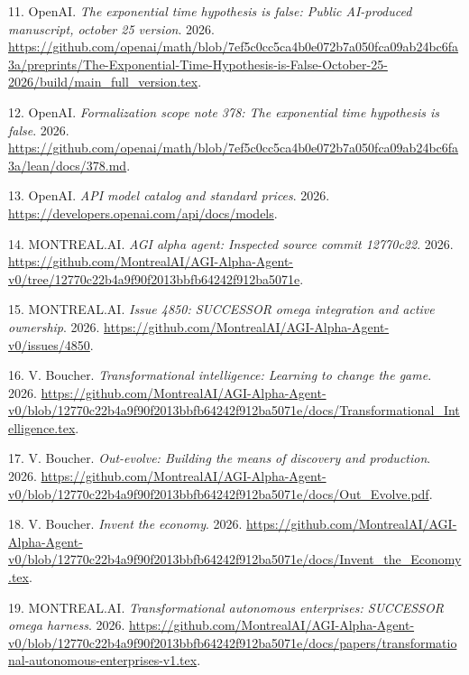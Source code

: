 \documentclass[
  11pt,
]{article}
\newlength{\cslhangindent}
\newlength{\cslentryspacingunit} %
\newenvironment{CSLReferences}[2] %
 {%
  \setlength{\parindent}{0pt}
  \ifodd #1
  \let\oldpar\par
  \def\par{\hangindent=\cslhangindent\oldpar}
  \fi
  \setlength{\parskip}{#2\cslentryspacingunit}
 }%
 {}
\begin{document}
\begin{CSLReferences}{1}{1}
\leavevmode{}%
11. OpenAI. \emph{The exponential time hypothesis is false: Public
AI-produced manuscript, october 25 version}. 2026.
\url{https://github.com/openai/math/blob/7ef5c0cc5ca4b0e072b7a050fca09ab24bc6fa3a/preprints/The-Exponential-Time-Hypothesis-is-False-October-25-2026/build/main_full_version.tex}.

\leavevmode{}%
12. OpenAI. \emph{Formalization scope note 378: The exponential time
hypothesis is false}. 2026.
\url{https://github.com/openai/math/blob/7ef5c0cc5ca4b0e072b7a050fca09ab24bc6fa3a/lean/docs/378.md}.

\leavevmode{}%
13. OpenAI. \emph{API model catalog and standard prices}. 2026.
\url{https://developers.openai.com/api/docs/models}.

\leavevmode{}%
14. MONTREAL.AI. \emph{AGI alpha agent: Inspected source commit
12770c22}. 2026.
\url{https://github.com/MontrealAI/AGI-Alpha-Agent-v0/tree/12770c22b4a9f90f2013bbfb64242f912ba5071e}.

\leavevmode{}%
15. MONTREAL.AI. \emph{Issue 4850: SUCCESSOR omega integration and
active ownership}. 2026.
\url{https://github.com/MontrealAI/AGI-Alpha-Agent-v0/issues/4850}.

\leavevmode{}%
16. V. Boucher. \emph{Transformational intelligence: Learning to change
the game}. 2026.
\url{https://github.com/MontrealAI/AGI-Alpha-Agent-v0/blob/12770c22b4a9f90f2013bbfb64242f912ba5071e/docs/Transformational_Intelligence.tex}.

\leavevmode{}%
17. V. Boucher. \emph{Out-evolve: Building the means of discovery and
production}. 2026.
\url{https://github.com/MontrealAI/AGI-Alpha-Agent-v0/blob/12770c22b4a9f90f2013bbfb64242f912ba5071e/docs/Out_Evolve.pdf}.

\leavevmode{}%
18. V. Boucher. \emph{Invent the economy}. 2026.
\url{https://github.com/MontrealAI/AGI-Alpha-Agent-v0/blob/12770c22b4a9f90f2013bbfb64242f912ba5071e/docs/Invent_the_Economy.tex}.

\leavevmode{}%
19. MONTREAL.AI. \emph{Transformational autonomous enterprises:
SUCCESSOR omega harness}. 2026.
\url{https://github.com/MontrealAI/AGI-Alpha-Agent-v0/blob/12770c22b4a9f90f2013bbfb64242f912ba5071e/docs/papers/transformational-autonomous-enterprises-v1.tex}.


\end{CSLReferences}
\end{document}
